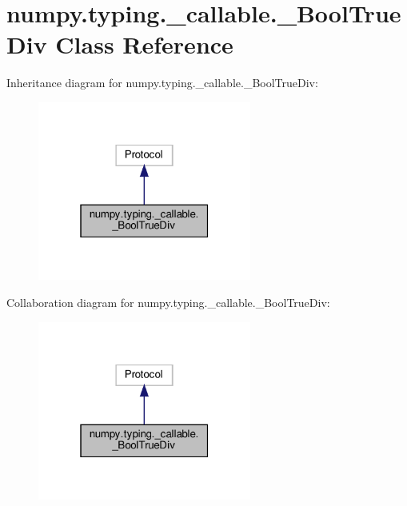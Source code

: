 \hypertarget{classnumpy_1_1typing_1_1__callable_1_1__BoolTrueDiv}{}\section{numpy.\+typing.\+\_\+callable.\+\_\+\+Bool\+True\+Div Class Reference}
\label{classnumpy_1_1typing_1_1__callable_1_1__BoolTrueDiv}


Inheritance diagram for numpy.\+typing.\+\_\+callable.\+\_\+\+Bool\+True\+Div\+:
\nopagebreak
\begin{figure}[H]
\begin{center}
\leavevmode
\includegraphics[width=199pt]{classnumpy_1_1typing_1_1__callable_1_1__BoolTrueDiv__inherit__graph}
\end{center}
\end{figure}


Collaboration diagram for numpy.\+typing.\+\_\+callable.\+\_\+\+Bool\+True\+Div\+:
\nopagebreak
\begin{figure}[H]
\begin{center}
\leavevmode
\includegraphics[width=199pt]{classnumpy_1_1typing_1_1__callable_1_1__BoolTrueDiv__coll__graph}
\end{center}
\end{figure}

